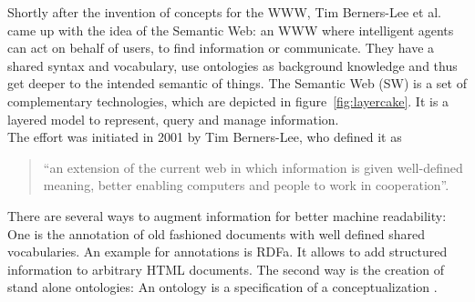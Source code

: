 Shortly after the invention of concepts for the WWW, Tim Berners-Lee et al. came up with the idea of the Semantic Web: an WWW where intelligent agents can act on behalf of users, to find information or communicate.
They have a shared syntax and vocabulary, use ontologies as background knowledge and thus get deeper to the intended semantic of things.
The Semantic Web (SW) is a set of complementary technologies, which are depicted in figure~\ref{fig:layercake}. 
It is a layered model to represent, query and manage information.\\
The effort was initiated in 2001 by Tim Berners-Lee, who defined it as 
\begin{quote}
"`an extension of the current web in which information is given well-defined
meaning, better enabling computers and people to work in cooperation"'.
\cite{berners}
\end{quote}
There are several ways to augment information for better machine readability: 
One is the annotation of old fashioned documents with well defined shared vocabularies. 
An example for annotations is RDFa. 
It allows to add structured information to arbitrary HTML documents. 
The second way is the creation of stand alone ontologies: An ontology is a specification of a conceptualization \cite{gruber}.\\

